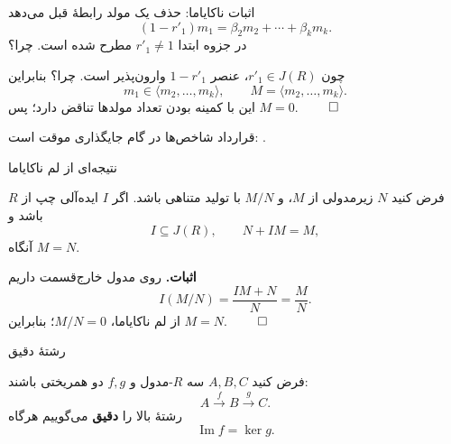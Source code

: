 \begin{frame}[t]{اثبات ناکایاما: حذف یک مولد}
    \label{lec16:nakayama-contradiction}
    رابطهٔ قبل می‌دهد
    \[
        (1-r'_1)m_1=\beta_2m_2+\cdots+\beta_km_k.
    \]
    در جزوه ابتدا \(r'_1\ne1\) مطرح شده است. \alert{چرا؟}
    \par\medskip
    چون \(r'_1\in J(R)\)، عنصر \(1-r'_1\) وارون‌پذیر است.
    \alert{چرا؟}
    بنابراین
    \[
        m_1\in\langle m_2,\ldots,m_k\rangle,
        \qquad M=\langle m_2,\ldots,m_k\rangle.
    \]
    این با کمینه بودن تعداد مولدها تناقض دارد؛ پس \(M=0\).
    \hfill\(\qed\)
    \medskip

    {\footnotesize قرارداد شاخص‌ها در گام جایگذاری موقت است: .}
\end{frame}

\begin{frame}[t]{نتیجه‌ای از لم ناکایاما}
    \label{lec16:nakayama-quotient}
    \begin{corollary}
        فرض کنید \(N\) زیرمدولی از \(M\)، و \(M/N\) با تولید متناهی باشد.
        اگر \(I\) ایده‌آلی چپ از \(R\) باشد و
        \[
            I\subseteq J(R),\qquad N+IM=M,
        \]
        آنگاه \(M=N\).
    \end{corollary}
    \textbf{اثبات.} روی مدول خارج‌قسمت داریم
    \[
        I(M/N)=\frac{IM+N}{N}=\frac{M}{N}.
    \]
    از لم ناکایاما، \(M/N=0\)؛ بنابراین \(M=N\). \hfill\(\qed\)
\end{frame}

\begin{frame}[t]{رشتهٔ دقیق}
    \label{lec16:exact-at-middle}
    \begin{definition}
        فرض کنید \(A,B,C\) سه \(R\)-مدول و \(f,g\) دو همریختی باشند:
        \[
            A\xrightarrow{f}B\xrightarrow{g}C.
        \]
        رشتهٔ بالا را \textbf{دقیق} می‌گوییم هرگاه
        \[
            \operatorname{Im}f=\ker g.
        \]
    \end{definition}
\end{frame}

